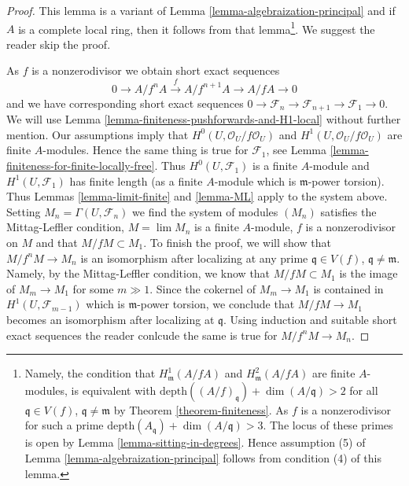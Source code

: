 \begin{proof}
This lemma is a variant of
Lemma \ref{lemma-algebraization-principal}
and if $A$ is a complete local ring, then it follows from that
lemma\footnote{Namely, the condition that
$H^1_\mathfrak m(A/fA)$ and $H^2_\mathfrak m(A/fA)$
are finite $A$-modules, is equivalent with
$\text{depth}((A/f)_\mathfrak q) + \dim(A/\mathfrak q) > 2$
for all $\mathfrak q \in V(f)$, $\mathfrak q \not = \mathfrak m$
by Theorem \ref{theorem-finiteness}. As $f$ is a nonzerodivisor
for such a prime
$\text{depth}(A_\mathfrak q) + \dim(A/\mathfrak q) > 3$. The locus
of these primes is open by Lemma \ref{lemma-sitting-in-degrees}.
Hence assumption (5) of Lemma \ref{lemma-algebraization-principal}
follows from condition (4) of this lemma.}.
We suggest the reader skip the proof.

\medskip\noindent
As $f$ is a nonzerodivisor we obtain short exact sequences
$$
0 \to A/f^nA \xrightarrow{f} A/f^{n + 1}A \to A/fA \to 0
$$
and we have corresponding short exact sequences
$0 \to \mathcal{F}_n \to \mathcal{F}_{n + 1} \to \mathcal{F}_1 \to 0$.
We will use Lemma \ref{lemma-finiteness-pushforwards-and-H1-local}
without further mention. Our assumptions imply that
$H^0(U, \mathcal{O}_U/f\mathcal{O}_U)$ and
$H^1(U, \mathcal{O}_U/f\mathcal{O}_U)$
are finite $A$-modules. Hence the same thing is true for $\mathcal{F}_1$, see
Lemma \ref{lemma-finiteness-for-finite-locally-free}.
Thus $H^0(U, \mathcal{F}_1)$ is a finite $A$-module
and $H^1(U, \mathcal{F}_1)$ has finite length
(as a finite $A$-module which is $\mathfrak m$-power torsion).
Thus Lemmas \ref{lemma-limit-finite} and
\ref{lemma-ML} apply to the system above. Setting
$M_n = \Gamma(U, \mathcal{F}_n)$ we find
the system of modules $(M_n)$ satisfies the Mittag-Leffler
condition, $M = \lim M_n$ is a finite $A$-module, $f$ is a
nonzerodivisor on $M$ and that $M/fM \subset M_1$. To finish the proof,
we will show that $M/f^nM \to M_n$ is an isomorphism after
localizing at any prime $\mathfrak q \in V(f)$,
$\mathfrak q \not = \mathfrak m$. Namely, by the Mittag-Leffler
condition, we know that $M/fM \subset M_1$ is the image of
$M_m \to M_1$ for some $m \gg 1$. Since the cokernel of
$M_m \to M_1$ is contained in $H^1(U, \mathcal{F}_{m -  1})$
which is $\mathfrak m$-power torsion, we conclude that
$M/fM \to M_1$ becomes an isomorphism after localizing at $\mathfrak q$.
Using induction and suitable short exact sequences the reader
conlcude the same is true for $M/f^n M \to M_n$.
\end{proof}






